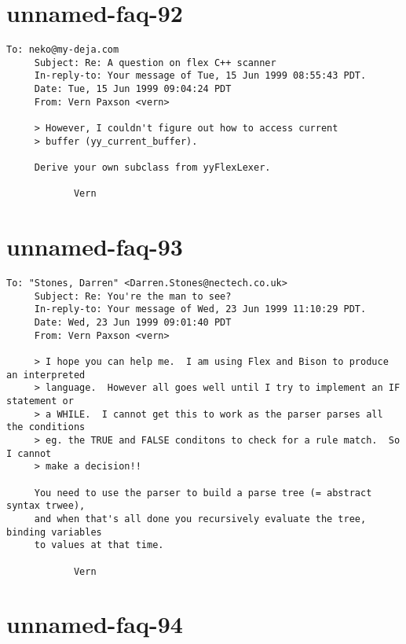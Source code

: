 \documentclass[openany,oneside]{book}
\begin{document}
\section{unnamed-faq-92}

\begin{verbatim}
To: neko@my-deja.com
     Subject: Re: A question on flex C++ scanner
     In-reply-to: Your message of Tue, 15 Jun 1999 08:55:43 PDT.
     Date: Tue, 15 Jun 1999 09:04:24 PDT
     From: Vern Paxson <vern>
     
     > However, I couldn't figure out how to access current
     > buffer (yy_current_buffer).
     
     Derive your own subclass from yyFlexLexer.
     
     		Vern
\end{verbatim}

\section{unnamed-faq-93}

\begin{verbatim}
To: "Stones, Darren" <Darren.Stones@nectech.co.uk>
     Subject: Re: You're the man to see?
     In-reply-to: Your message of Wed, 23 Jun 1999 11:10:29 PDT.
     Date: Wed, 23 Jun 1999 09:01:40 PDT
     From: Vern Paxson <vern>
     
     > I hope you can help me.  I am using Flex and Bison to produce an interpreted
     > language.  However all goes well until I try to implement an IF statement or
     > a WHILE.  I cannot get this to work as the parser parses all the conditions
     > eg. the TRUE and FALSE conditons to check for a rule match.  So I cannot
     > make a decision!!
     
     You need to use the parser to build a parse tree (= abstract syntax trwee),
     and when that's all done you recursively evaluate the tree, binding variables
     to values at that time.
     
     		Vern
\end{verbatim}

\section{unnamed-faq-94}
\end{document}
